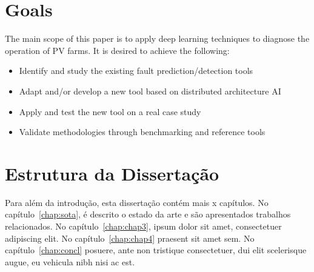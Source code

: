 \section{Goals} \label{sec:goals}

The main scope of this paper is to apply deep learning techniques to diagnose
the operation of PV farms. It is desired to achieve the following:

\begin{itemize}
  \item Identify and study the existing fault prediction/detection tools
  \item Adapt and/or develop a new tool based on distributed architecture AI
  \item Apply and test the new tool on a real case study
  \item Validate methodologies through benchmarking and reference tools
\end{itemize}


\section{Estrutura da Dissertação} \label{sec:struct}

Para além da introdução, esta dissertação contém mais x capítulos.
No capítulo~\ref{chap:sota}, é descrito o estado da arte e são
apresentados trabalhos relacionados. 
No capítulo~\ref{chap:chap3}, ipsum dolor sit amet, consectetuer
adipiscing elit.
No capítulo~\ref{chap:chap4} praesent sit amet sem. 
No capítulo~\ref{chap:concl}  posuere, ante non tristique
consectetuer, dui elit scelerisque augue, eu vehicula nibh nisi ac
est. 
